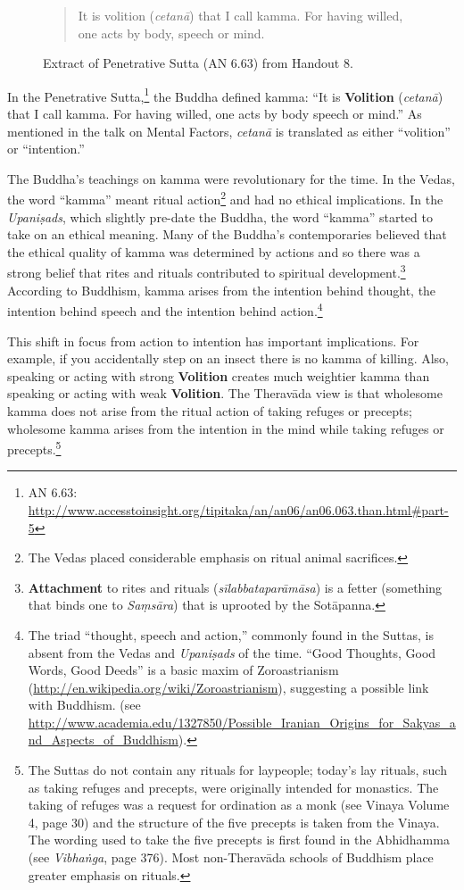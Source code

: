 \begin{figure}[H]
\begin{quotation}
It is volition (\textit{cetanā}) that I call kamma. For having willed, one acts by body, speech or mind.
\end{quotation}
\caption{Extract of Penetrative Sutta (AN 6.63) from Handout 8.}
\label{fig:AN6}
\end{figure}

In the Penetrative Sutta,\footnote{AN 6.63: \url{http://www.accesstoinsight.org/tipitaka/an/an06/an06.063.than.html\#part-5}} the Buddha defined kamma: “It is \textbf{Volition} (\textit{cetanā}) that I call kamma. For having willed, one acts by body speech or mind.” As mentioned in the talk on Mental Factors, \textit{cetanā} is translated as either “volition” or “intention.”

The Buddha’s teachings on kamma were revolutionary for the time. In the Vedas, the word “kamma” meant ritual action\footnote{The Vedas placed considerable emphasis on ritual animal sacrifices.} and had no ethical implications. In the \textit{Upaniṣads}, which slightly pre-date the Buddha, the word “kamma” started to take on an ethical meaning. Many of the Buddha’s contemporaries believed that the ethical quality of kamma was determined by actions and so there was a strong belief that rites and rituals contributed to spiritual development.\footnote{\textbf{Attachment} to rites and rituals (\textit{sīlabbataparāmāsa}) is a fetter (something that binds one to \textit{Saṃsāra}) that is uprooted by the Sotāpanna.} According to Buddhism, kamma arises from the intention behind thought, the intention behind speech and the intention behind action.\footnote{The triad “thought, speech and action,” commonly found in the Suttas, is absent from the Vedas and \textit{Upaniṣads} of the time. “Good Thoughts, Good Words, Good Deeds” is a basic maxim of Zoroastrianism (\url{http://en.wikipedia.org/wiki/Zoroastrianism}), suggesting a possible link with Buddhism. (see\\
\url{http://www.academia.edu/1327850/Possible_Iranian_Origins_for_Sakyas_and_Aspects_of_Buddhism}).}

This shift in focus from action to intention has important implications. For example, if you accidentally step on an insect there is no kamma of killing. Also, speaking or acting with strong \textbf{Volition} creates much weightier kamma than speaking or acting with weak \textbf{Volition}. The Theravāda view is that wholesome kamma does not arise from the ritual action of taking refuges or precepts; wholesome kamma arises from the intention in the mind while taking refuges or precepts.\footnote{The Suttas do not contain any rituals for laypeople; today’s lay rituals, such as taking refuges and precepts, were originally intended for monastics. The taking of refuges was a request for ordination as a monk (see Vinaya Volume 4, page 30) and the structure of the five precepts is taken from the Vinaya. The wording used to take the five precepts is first found in the Abhidhamma (see \textit{Vibhaṅga}, page 376). Most non-Theravāda schools of Buddhism place greater emphasis on rituals.}

